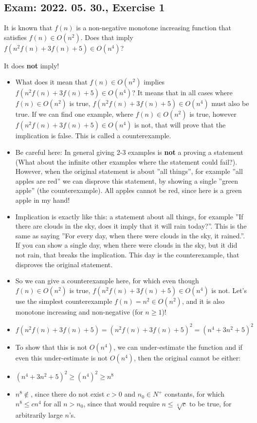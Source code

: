 \subsection{Exam: 2022. 05. 30., Exercise 1}


It is known that $f(n)$ is a non-negative monotone increasing function that
satisfies $f(n) \in{} O(n^2)$. Does that imply $f(n^2f(n)+3f(n)+5) \in{} O(n^4)$?


It does \textbf{not} imply!

\begin{itemize}
\item What does it mean that $f(n) \in{} O(n^2)$ implies $f(n^2f(n)+3f(n)+5) \in{} O(n^4)$? It means that in all cases where $f(n) \in{} O(n^2)$ is true, $f(n^2f(n)+3f(n)+5) \in{} O(n^4)$ must also be true. If we can find one example, where $f(n) \in{} O(n^2)$ is true, however $f(n^2f(n)+3f(n)+5) \in{} O(n^4)$ is not, that will prove that the implication is false. This is called a counterexample.
\item Be careful here: In general giving 2-3 examples is \textbf{not} a proving a statement (What about the infinite other examples where the statement could fail?). However, when the original statement is about ''all things'', for example ''all apples are red'' we can disprove this statement, by showing a single ''green apple'' (the counterexample). All apples cannot be red, since here is a green apple in my hand!
\item Implication is exactly like this: a statement about all things, for example ''If there are clouds in the sky, does it imply that it will rain today?''. This is the same as saying ''For every day, when there were clouds in the sky, it rained.''. If you can show a single day, when there were clouds in the sky, but it did not rain, that breaks the implication. This day is the counterexample, that disproves the original statement.
\item So we can give a counterexample here, for which even though $f(n) \in{} O(n^2)$ is true, $f(n^2f(n)+3f(n)+5) \in{} O(n^4)$ is not. Let's use the simplest counterexample $f(n) = n^2 \in{} O(n^2)$, and it is also monotone increasing and non-negative (for $n\geq{}1$)!
\item $f(n^2f(n)+3f(n)+5) = (n^2f(n)+3f(n)+5)^2 = (n^4+3n^2+5)^2$
\item To show that this is not $O(n^4)$, we can under-estimate the function and if even this under-estimate is not $O(n^4)$, then the original cannot be either:
\item $(n^4+3n^2+5)^2\geq{}(n^4)^2\geq{}n^8$
\item $n^8 \notin{}$, since there do not exist $c>0$ and $n_0\in{}N^+$ constants, for which $n^8\leq{}cn^4$ for all $n>n_0$, since that would require $n\leq{}\sqrt[4]{c}$ to be true, for arbitrarily large $n$'s.
\end{itemize}

